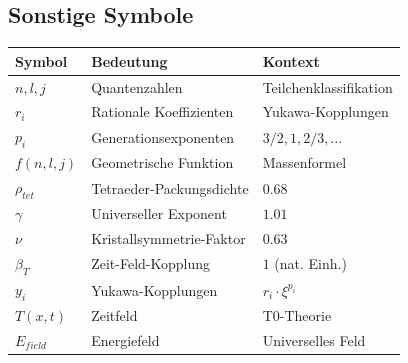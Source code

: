 \subsection{Sonstige Symbole}
\begin{longtable}{lll}
	\toprule
	\textbf{Symbol} & \textbf{Bedeutung} & \textbf{Kontext} \\
	\midrule
	$n, l, j$ & Quantenzahlen & Teilchenklassifikation \\
	$r_i$ & Rationale Koeffizienten & Yukawa-Kopplungen \\
	$p_i$ & Generationsexponenten & $3/2, 1, 2/3, ...$ \\
	$f(n,l,j)$ & Geometrische Funktion & Massenformel \\
	$\rho_{tet}$ & Tetraeder-Packungsdichte & $0.68$ \\
	$\gamma$ & Universeller Exponent & $1.01$ \\
	$\nu$ & Kristallsymmetrie-Faktor & $0.63$ \\
	$\beta_T$ & Zeit-Feld-Kopplung & $1$ (nat. Einh.) \\
	$y_i$ & Yukawa-Kopplungen & $r_i \cdot \xi^{p_i}$ \\
	$T(x,t)$ & Zeitfeld & T0-Theorie \\
	$E_{field}$ & Energiefeld & Universelles Feld \\
	\bottomrule
\end{longtable}
